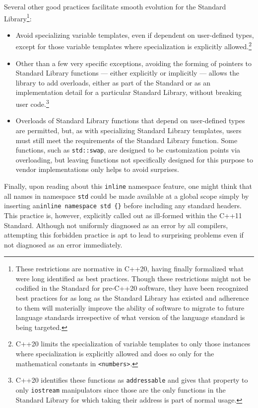 Several other good practices facilitate smooth evolution for the
Standard Library{\cprotect\footnote{These restrictions are normative in
C++20, having finally formalized what were long identified as best
practices. Though these restrictions might not be codified in the
Standard for pre-C++20 software, they have been recognized best
practices for as long as the Standard Library has existed and
adherence to them will materially improve the ability of software to
migrate to future language standards irrespective of what version of
  the language standard is being targeted.}}:
\begin{itemize}
\item{Avoid specializing variable templates, even if dependent on user-defined types, except for those variable templates where specialization is explicitly allowed.\cprotect\footnote{C++20 limits the specialization of variable templates to only those instances where specialization is explicitly allowed and does so only for the mathematical constants in \lstinline!<numbers>!.}}
\item{Other than a few very specific exceptions, avoiding the forming of pointers to Standard Library functions — either explicitly or implicitly — allows the library to add overloads, either as part of the Standard or as an implementation detail for a particular Standard Library, without breaking user code.\cprotect\footnote{C++20 identifies these functions as \lstinline!addressable! and gives that property to only \lstinline!iostream! manipulators since those are the only functions in the Standard Library for which taking their address is part of normal usage.}}
\item{Overloads of Standard Library functions that depend on user-defined types are permitted, but, as with specializing Standard Library templates, users must still meet the requirements of the Standard Library function. Some functions, such as \lstinline!std::swap!, are designed to be customization points via overloading, but leaving functions not specifically designed for this purpose to vendor implementations only helps to avoid surprises.}
\end{itemize}

Finally, upon reading about this \lstinline!inline! namespace feature, one
might think that all names in namespace \lstinline!std! could be made
available at a global scope simply by inserting an\linebreak[4]%
\lstinline!inline!~\lstinline!namespace!~\lstinline!std!~\lstinline!{}! before
including any standard headers. This practice is, however, explicitly
called out as ill-formed within the C++11 Standard. Although not uniformly diagnosed as an error by
all compilers, attempting this forbidden practice is apt to lead to
surprising problems even if not diagnosed as an error immediately.

